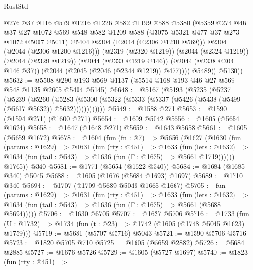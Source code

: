 \begin{lexlean}{RustStd}
\begin{coremodule}
{\begin{coremodule}
{{{{{{{{{{{{{{                  @276
                  @37
                  @116
                  @579
                  @1216
                  @1226
                  @582
                  @1199
                  @588
                  @5380
                  (@5359
                    @274
                    @46
                    @37
                    @27
                    @1072
                    @569
                    @548
                    @582
                    @1209
                    @588
                    (@3075 @5321 @477 @37 @273 @1072 @5007 @5011)
                    @5404
                    @2304
                    (@2044 (@2306 @1210 @569)))
                  @2304
                  (@2044 (@2306 @1200 @1216)))
                (@2319 (@2320 @1219))
                (@2044 (@2324 @1219))
                (@2044 (@2329 @1219))
                (@2044 (@2333 @1219 @146))
                (@2044 (@2338 @304 @146 @37))
                (@2044 (@2045 (@2046 (@2344 @1219)) @477))))
            @5489))
        @5130))
@5632 := @5508 @290 @193 @569 @1137 (@5514 @168 @193 @46 @27 @569 @548 @1135 @2605 @5404 @5145)
@5648 := @5167
    (@5193
      (@5235
        (@5237
          (@5239
            (@5260
              (@5283
                (@5300 (@5322 (@5333 (@5337 (@5426 (@5438 (@5499 (@5617 @5632)) @5632))))))))))))
@5649 := @1588 @271
@5653 := @1590 (@1594 @271) (@1600 @271)
@5654 := @1609 @5042
@5656 := @1605 (@5654 @1624)
@5658 := @1647 (@1648 @271)
@5659 := @1643 @5658
@5661 := @1605 (@5659 @1672)
@5678 := @1604
    (fun (fn : @7) =>
    @5656
      (@1627
        (@1630
          (fun (params : @1629) =>
          @1631
            (fun (rty : @451) =>
            @1633
              (fun (lets : @1632) =>
              @1634 (fun (tail : @543) => @1636 (fun (Γ : @1635) => @5661 @1719))))))
        @1765))
    @340
@5681 := @1771 (@5654 (@1622 @340))
@5684 := @1684 (@1685 @340) @5045
@5688 := @1605 (@1676 (@5684 @1693) @1697)
@5689 := @1710 @340
@5694 := @1707 (@1709 @5689 @5048 @1665 @1667)
@5705 := fun (params : @1629) =>
  @1631
    (fun (rty : @451) =>
    @1633
      (fun (lets : @1632) =>
      @1634 (fun (tail : @543) => @1636 (fun (Γ : @1635) => @5661 (@5688 @5694)))))
@5706 := @1630 @5705
@5707 := @1627 @5706
@5716 := @1733 (fun (U : @1732) => @1734 (fun (t : @23) => @1742 (@1605 (@1748 @5045 @1623) @1759)))
@5719 := @5681 (@5707 @5716) @5043
@5721 := @1590 @5706 @5716
@5723 := @1820 @5705 @710
@5725 := @1605 (@5659 @2882)
@5726 := @5684 @2885
@5727 := @1676 @5726
@5729 := @1605 (@5727 @1697)
@5740 := @1823
    (fun (rty : @451) =>
}}}}}}}}}}}}}}
\end{coremodule}}
\end{coremodule}
\end{lexlean}
